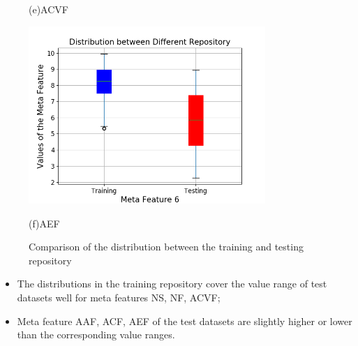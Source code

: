 \documentclass[aspectratio=1610]{beamer}
\begin{document}
\begin{frame}
\begin{figure}
\begin{minipage}[t]{0.25\linewidth}
		\parbox{1cm}{\small \hspace{3.5cm}(e)\scriptsize{ACVF}}
	\end{minipage}
	\begin{minipage}[t]{0.25\linewidth}
		\centering
		\includegraphics[width=0.8\textwidth]{Figures/Meta_Features/Feature_6.png}
		\parbox{1cm}{\small \hspace{3.5cm}(f)\scriptsize{AEF}}
	\end{minipage}
	\caption{\scriptsize{Comparison of the distribution between the training and testing repository}}
\end{figure}

\begin{itemize}\scriptsize
	\item The distributions in the training repository cover the value range of test datasets well for meta features NS, NF, ACVF;
	\item Meta feature AAF, ACF, AEF of the test datasets are slightly higher or lower than the corresponding value ranges.
\end{itemize}
\end{frame}
\end{document}
